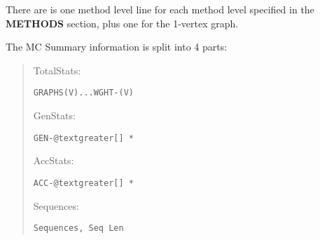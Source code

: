 \documentclass[openany,a4paper,10pt,english]{manual}
\begin{document}
There are is one method level line for each method level specified in the \textbf{METHODS} section, plus one  for the 1-vertex graph.

The MC Summary information is split into 4 parts:
\begin{quote}

TotalStats:

\begin{Verbatim}[commandchars=@\[\]]
GRAPHS(V)...WGHT-(V)
\end{Verbatim}

GenStats:

\begin{Verbatim}[commandchars=@\[\]]
GEN-@textgreater[] *
\end{Verbatim}

AccStats:

\begin{Verbatim}[commandchars=@\[\]]
ACC-@textgreater[] *
\end{Verbatim}

Sequences:

\begin{Verbatim}[commandchars=@\[\]]
Sequences, Seq Len
\end{Verbatim}
\end{quote}
\end{document}
